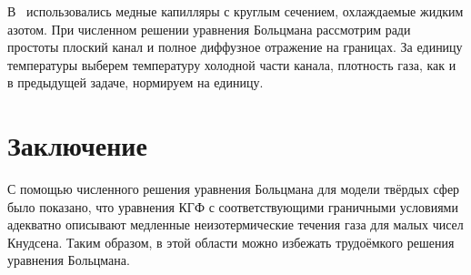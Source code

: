 \documentclass[
aps,%
12pt,%
final,%
notitlepage,%
oneside,%
onecolumn,%
nobibnotes,%
nofootinbib,%
superscriptaddress,%
noshowpacs,%
centertags]%
{revtex4}
\begin{document}
В~\cite{Friedlander2003} использовались медные капилляры с круглым сечением,
охлаждаемые жидким азотом. При численном решении уравнения Больцмана рассмотрим
ради простоты плоский канал и полное диффузное отражение на границах.
За единицу температуры выберем температуру холодной части канала,
плотность газа, как и в предыдущей задаче, нормируем на единицу.

\section{Заключение}

С помощью численного решения уравнения Больцмана для модели твёрдых сфер было показано,
что уравнения КГФ с соответствующими граничными условиями адекватно описывают
медленные неизотермические течения газа для малых чисел Кнудсена.
Таким образом, в этой области можно избежать трудоёмкого решения уравнения Больцмана.



\end{document}
